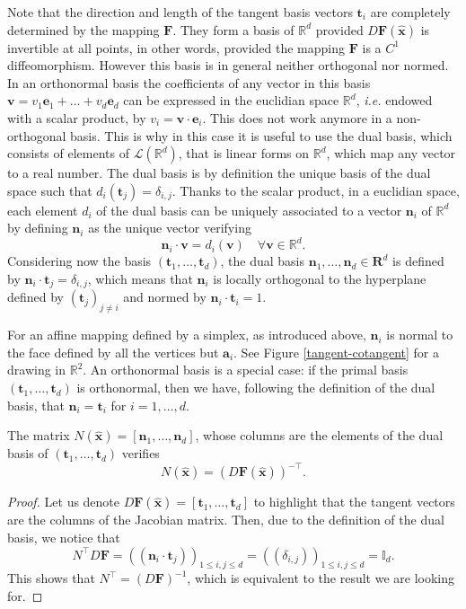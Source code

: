 Note that the direction and length of the tangent basis vectors $ \mathbf{t}_i$ are completely determined by the mapping $ \mathbf{F}$. They form a basis of $ \mathbb{R}^d$ provided $D \mathbf{F} ( \hat{ \mathbf{x}})$ is invertible at all points, in other words, provided the mapping $ \mathbf{F}$ is a $C^1$ diffeomorphism. However this basis is in general neither orthogonal nor normed. In an orthonormal basis the coefficients of any vector in this basis $ \mathbf{v} = v_1 \mathbf{e}_1 + \dots + v_d \mathbf{e}_d$
can be expressed in the euclidian space $ \mathbb{R}^d$, \textit{i.e.} endowed with a scalar product,  by
$v_i= \mathbf{v} \cdot \mathbf{e}_i$. This does not work anymore in a non-orthogonal basis. This is why in this case it is useful to use the dual basis, which consists of elements of $\mathcal{L}( \mathbb{R}^d)$, that is  linear forms on $ \mathbb{R}^d$, which map any vector to a real number. The dual basis is by definition the unique basis of the dual space such that $ d_i ( \mathbf{t}_j)= \delta_{i,j}$. Thanks to the scalar product, in a euclidian space, each element $ d_i$ of the dual basis can be uniquely associated to a vector $ \mathbf{n}_i $ of $ \mathbb{R}^d$ by defining $ \mathbf{n}_i$ as the unique vector verifying
$$  \mathbf{n}_i\cdot \mathbf{v} = d_i( \mathbf{v})  \quad \forall \mathbf{v}\in \mathbb{R}^d.$$
Considering now the basis $ (\mathbf{t}_1, \dots, \mathbf{t}_d) $, the dual basis  $ \mathbf{n}_1, \dots, \mathbf{n}_d \in \mathbf{R}^d $ is defined by $ \mathbf{n}_i \cdot \mathbf{t}_j = \delta_{i,j}$, which means that $ \mathbf{n}_i$ is locally orthogonal to the hyperplane defined by $ ( \mathbf{t}_j)_{j\neq i}$ and normed by $ \mathbf{n}_i\cdot \mathbf{t}_i=1$. 

For an affine mapping defined by a simplex, as introduced above, $ \mathbf{n}_i$ is normal to the face
defined by all the vertices but $ \mathbf{a}_i$.  See  Figure \ref{tangent-cotangent} for a drawing in $\mathbb{R}^2$. An orthonormal basis is a special case: if the primal basis $ (\mathbf{t}_1, \dots, \mathbf{t}_d) $ is orthonormal, then we have, following the definition of the dual basis, that $ \mathbf{n}_i= \mathbf{t}_i$ for $i=1, \dots, d$.

\begin{lemma}
The matrix $N( \hat{\mathbf{x}})= [ \mathbf{n}_1, \dots, \mathbf{n}_d ]$,  whose columns are the elements  of the dual basis of $( \mathbf{t}_1, \dots,  \mathbf{t}_d)$ verifies
\begin{equation}\label{eq:defNcotangent}
N ( \hat{\mathbf{x}}) =  (D\mathbf{F}( \hat{\mathbf{x}}))^{-\top}.
\end{equation}
\end{lemma}
\begin{proof}
Let us denote $ D\mathbf{F}( \hat{\mathbf{x}}) = [ \mathbf{t}_1, \dots, \mathbf{t}_d ]$ to highlight that the tangent vectors are the columns of the Jacobian matrix. Then, due to the definition of the dual basis, we notice that 
$$ N^\top D\mathbf{F}
= ((\mathbf{n}_i \cdot \mathbf{t}_j))_{1\leq i,j\leq d} =  ((\delta_{i,j}))_{1\leq i,j\leq d}= \mathbb{I}_d. $$
This shows that $N^\top = (D\mathbf{F})^{-1}$, which is equivalent to the result we are looking for.

\end{proof}

